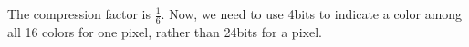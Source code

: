 \begin{answer}
The compression factor is $\frac{1}{6}$. Now, we need to use 4bits to indicate a color among all 16 colors for one pixel, rather than 24bits for a pixel.
\end{answer}
